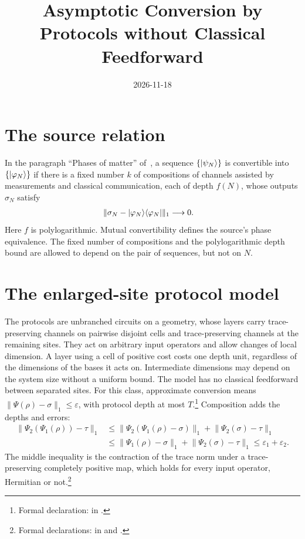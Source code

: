 \documentclass{article}
\title{Asymptotic Conversion by Protocols without Classical Feedforward}
\author{}
\date{2026-11-18}
\begin{document}
\maketitle
{}

\section{The source relation}
In the paragraph ``Phases of matter'' of~\cite{Piroli2021LOCC}, a sequence
$\{|\psi_N\rangle\}$ is convertible into $\{|\varphi_N\rangle\}$ if there is a
fixed number $k$ of compositions of channels assisted by measurements and
classical communication, each of depth $f(N)$, whose outputs $\sigma_N$
satisfy
\begin{align}
    \lVert\sigma_N-|\varphi_N\rangle\langle \varphi_N|\rVert_1 & \longrightarrow 0.
    \label{eq:psc21_local_channel_phase_scope_source_convergence}
\end{align}
Here $f$ is polylogarithmic. Mutual convertibility defines the source's
phase equivalence. The fixed number of compositions and the polylogarithmic
depth bound are allowed to depend on the pair of sequences, but not on $N$.

\section{The enlarged-site protocol model}
The protocols are unbranched circuits on a geometry, whose layers carry
trace-preserving channels on pairwise disjoint cells and trace-preserving
channels at the remaining sites. They act on arbitrary input operators and
allow changes of local dimension. A layer using a cell of positive cost costs
one depth unit, regardless of the dimensions of the bases it acts on.
Intermediate dimensions may depend on the system size without a uniform
bound. The model has no classical feedforward between separated sites. For
this class, approximate conversion means
$\lVert\Psi(\rho)-\sigma\rVert_1\le\varepsilon$, with protocol depth at most
$T$.\footnote{Formal declaration:
     in
    .}
Composition adds the depths and errors:
\begin{align}
    \lVert\Psi_2(\Psi_1(\rho))-\tau\rVert_1
     & \le \lVert\Psi_2(\Psi_1(\rho)-\sigma)\rVert_1
    +\lVert\Psi_2(\sigma)-\tau\rVert_1               \\
     & \le \lVert\Psi_1(\rho)-\sigma\rVert_1
    +\lVert\Psi_2(\sigma)-\tau\rVert_1
    \le\varepsilon_1+\varepsilon_2.
    \label{eq:psc21_local_channel_phase_scope_composition_error}
\end{align}
The middle inequality is the contraction of the trace norm under a
trace-preserving completely positive map, which holds for every input
operator, Hermitian or not.\footnote{Formal declarations:
     in
     and
    .}
\end{document}
